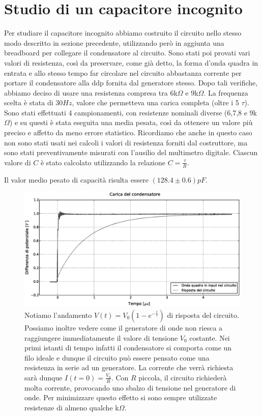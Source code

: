 \section{Studio di un capacitore incognito}
Per studiare il capacitore incognito abbiamo costruito il circuito nello stesso modo descritto in sezione precedente, utilizzando però in aggiunta una breadboard per collegare il condensatore al circuito. Sono stati poi provati vari valori di resistenza, così da preservare, come già detto, la forma d'onda quadra in entrata e allo stesso tempo far circolare nel circuito abbastanza corrente per portare il condensatore alla ddp fornita dal generatore stesso. Dopo tali verifiche, abbiamo deciso di usare una resistenza compresa tra $6$k$\Omega$ e $9$k$\Omega$. La frequenza scelta è stata di $30Hz$, valore che permetteva una carica completa (oltre i 5 $\tau$). Sono stati effettuati 4 campionamenti, con resistenze nominali diverse (6,7,8 e 9k$\Omega$) e su questi è stata eseguita una media pesata, così da ottenere un valore più preciso e affetto da meno errore statistico.
Ricordiamo che anche in questo caso non sono stati usati nei calcoli i valori di resistenza forniti dal costruttore, ma sono stati preventivamente misurati con l'ausilio del multimetro digitale. Ciascun valore di $C$ è stato calcolato utilizzando la relazione $C=\frac{\tau}{R}$.

Il valor medio pesato di capacità risulta essere $(128.4\pm0.6) pF$. 

\begin{figure}[h!]
    \centering
        \includegraphics[width=0.8 \textwidth]{figure3.eps}%
        \caption{Notiamo l'andamento $V(t)=V_0(1-e^{-\frac{t}{\tau}})$ di risposta del circuito. Possiamo inoltre vedere come il generatore di onde non riesca a raggiungere immediatamente il valore di tensione $V_0$ costante. Nei primi istanti di tempo infatti il condensatore si comporta come un filo ideale e dunque il circuito può essere pensato come una resistenza in serie ad un generatore. La corrente che verrà richiesta sarà dunque $I(t=0)=\frac{V_0}{R}$. Con $R$ piccola, il circuito richiederà molta corrente, provocando uno sbalzo di tensione nel generatore di onde. Per minimizzare questo effetto si sono sempre utilizzate resistenze di almeno qualche k$\Omega$.}
        \label{fig:1}
\end{figure}